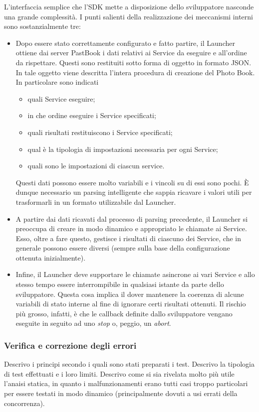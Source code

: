 				L'interfaccia semplice che l'SDK mette a disposizione dello sviluppatore nasconde una grande complessità. I punti
				salienti della realizzazione dei meccanismi interni sono sostanzialmente tre:
				\begin{itemize}
					\item Dopo essere stato correttamente configurato e fatto partire, il Launcher ottiene dai server PastBook i
					dati relativi ai Service da eseguire e all'ordine da rispettare. Questi sono restituiti sotto forma di
					oggetto in formato JSON. In tale oggetto viene descritta l'intera procedura di creazione del Photo Book.
					In particolare sono indicati
					\begin{itemize}
						\item quali Service eseguire;
						\item in che ordine eseguire i Service specificati;
						\item quali risultati restituiscono i Service specificati;
						\item qual è la tipologia di impostazioni necessaria per ogni Service;
						\item quali sono le impostazioni di ciascun service.
					\end{itemize}
					Questi dati possono essere molto variabili e i vincoli su di essi sono pochi. È dunque necessario un parsing
					intelligente che sappia ricavare i valori utili per trasformarli in un formato utilizzabile dal Launcher.
					\item A partire dai dati ricavati dal processo di parsing precedente, il Launcher si preoccupa di creare in
					modo dinamico e appropriato le chiamate ai Service. Esso, oltre a fare questo, gestisce i risultati di
					ciascuno dei Service, che in generale possono essere diversi (sempre sulla base della configurazione
					ottenuta inizialmente).
					\item Infine, il Launcher deve supportare le chiamate asincrone ai vari Service e allo stesso tempo essere
					interrompibile in qualsiasi istante da parte dello sviluppatore. Questa cosa implica il dover mantenere la
					coerenza di alcune variabili di stato interne al fine di ignorare certi risultati ottenuti. Il rischio più
					grosso, infatti, è che le callback definite dallo sviluppatore vengano eseguite in seguito ad uno
					\emph{stop} o, peggio, un \emph{abort}.
				\end{itemize}
			\subsubsection{Verifica e correzione degli errori}
				Descrivo i principi secondo i quali sono stati preparati i test. Descrivo la tipologia di test effettuati e i loro
				limiti. Descrivo come si sia rivelata molto più utile l'anaisi statica, in quanto i malfunzionamenti erano tutti
				casi troppo particolari per essere testati in modo dinamico (principalmente dovuti a usi errati della concorrenza).
